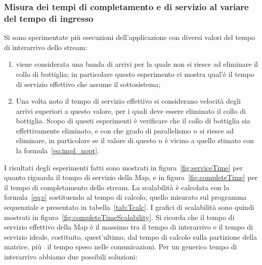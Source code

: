 


\FloatBarrier

\subsubsection*{Misura dei tempi di completamento e di servizio al variare del tempo di ingresso}
Si sono sperimentate pi\`u esecuzioni dell'applicazione con diversi valori del tempo di interarrivo dello stream: 
\begin{enumerate}  
\item viene considerata una banda di arrivi per la quale non si riesce ad eliminare il collo di bottiglia; in particolare questo esperimento ci mostra qual'\`e il tempo di servizio effettivo che assume il sottosistema;
\item Una volta noto il tempo di servizio effettivo si considerano velocit\`a degli arrivi superiori a questo valore, per i quali deve essere eliminato il collo di bottiglia. Scopo di questi esperimenti \`e verificare che il collo di bottiglia sia effettivamente eliminato, e con che grado di parallelismo $n$ si riesce ad eliminare, in particolare se il valore di questo $n$ \`e vicino a quello stimato con la formula~\ref{eq:impl_nopt}.
\end{enumerate}     
I risultati degli esperimenti fatti sono mostrati in figura~\ref{fig:serviceTime} per quanto riguarda il tempo di servizio della Map, e in figura~\ref{fig:completeTime} per il tempo di completamento dello stream. La scalabilit\`a \`e calcolata con la formula~\ref{eq:s} sostituendo al tempo di calcolo, quello misurato sul programma sequenziale e presentato in tabella~\ref{tab:Tcalc}. I grafici di scalabilit\`a sono quindi mostrati in figura~\ref{fig:completeTimeScalability}. Si ricorda che il tempo di servizio effettivo della Map \`e il massimo tra il tempo di interarrivo e il tempo di servizio ideale, costituito, quest'ultimo, dal tempo di calcolo sulla partizione della matrice, pi\`u \deltacom\ il tempo speso nelle comunicazioni. Per un generico tempo di interarrivo abbiamo due possibili soluzioni:

